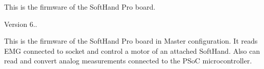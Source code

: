 This is the firmware of the Soft\+Hand Pro board. \begin{DoxyVersion}{Version}
6..
\end{DoxyVersion}
This is the firmware of the Soft\+Hand Pro board in Master configuration. It reads E\+MG connected to socket and control a motor of an attached Soft\+Hand. Also can read and convert analog measurements connected to the P\+SoC microcontroller. 